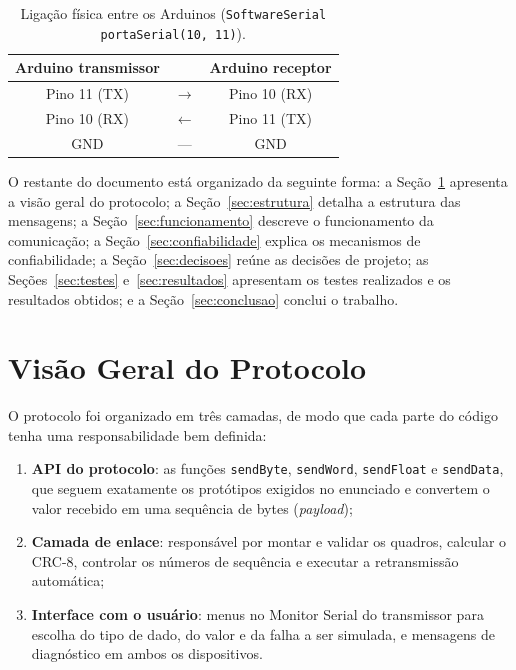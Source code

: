 \documentclass[12pt]{article}
\begin{document}
\begin{table}[!htb]
\centering
\caption{Ligação física entre os Arduinos (\texttt{SoftwareSerial portaSerial(10, 11)}).}
\label{tab:ligacao}
\begin{tabular}{ccc}
\toprule
\textbf{Arduino transmissor} & & \textbf{Arduino receptor} \\
\midrule
Pino 11 (TX) & $\rightarrow$ & Pino 10 (RX) \\
Pino 10 (RX) & $\leftarrow$ & Pino 11 (TX) \\
GND & --- & GND \\
\bottomrule
\end{tabular}
\end{table}

O restante do documento está organizado da seguinte forma: a Seção~\ref{sec:protocolo} apresenta a visão geral do protocolo; a Seção~\ref{sec:estrutura} detalha a estrutura das mensagens; a Seção~\ref{sec:funcionamento} descreve o funcionamento da comunicação; a Seção~\ref{sec:confiabilidade} explica os mecanismos de confiabilidade; a Seção~\ref{sec:decisoes} reúne as decisões de projeto; as Seções~\ref{sec:testes} e~\ref{sec:resultados} apresentam os testes realizados e os resultados obtidos; e a Seção~\ref{sec:conclusao} conclui o trabalho.

\section{Visão Geral do Protocolo}
\label{sec:protocolo}

O protocolo foi organizado em três camadas, de modo que cada parte do código tenha uma responsabilidade bem definida:

\begin{enumerate}
  \item \textbf{API do protocolo}: as funções \texttt{sendByte}, \texttt{sendWord}, \texttt{sendFloat} e \texttt{sendData}, que seguem exatamente os protótipos exigidos no enunciado e convertem o valor recebido em uma sequência de bytes (\emph{payload});
  \item \textbf{Camada de enlace}: responsável por montar e validar os quadros, calcular o CRC-8, controlar os números de sequência e executar a retransmissão automática;
  \item \textbf{Interface com o usuário}: menus no Monitor Serial do transmissor para escolha do tipo de dado, do valor e da falha a ser simulada, e mensagens de diagnóstico em ambos os dispositivos.
\end{enumerate}
\end{document}
